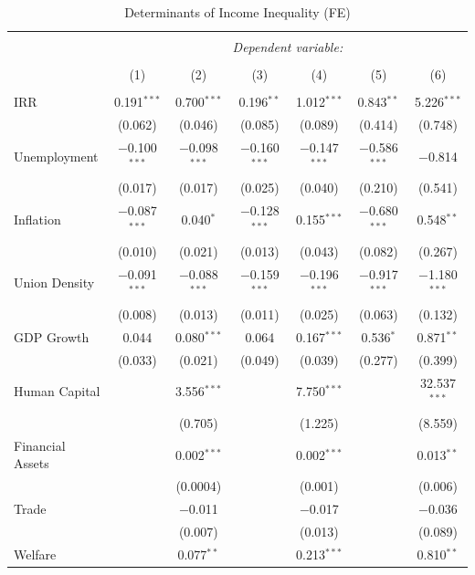 \documentclass[
  11pt,
]{article}
\begin{document}
\begin{table}[!htbp] \centering 
  \caption{\label{ineq1}Determinants of Income Inequality (FE)} 
  \label{} 
\small 
\begin{tabular}{@{\extracolsep{5pt}}lcccccc} 
\\[-1.8ex]\hline 
\hline \\[-1.8ex] 
 & \multicolumn{6}{c}{\textit{Dependent variable:}} \\ 
\cline{2-7} 
\\[-1.8ex] & (1) & (2) & (3) & (4) & (5) & (6)\\ 
\hline \\[-1.8ex] 
 IRR & 0.191$^{***}$ & 0.700$^{***}$ & 0.196$^{**}$ & 1.012$^{***}$ & 0.843$^{**}$ & 5.226$^{***}$ \\ 
  & (0.062) & (0.046) & (0.085) & (0.089) & (0.414) & (0.748) \\ 
  Unemployment & $-$0.100$^{***}$ & $-$0.098$^{***}$ & $-$0.160$^{***}$ & $-$0.147$^{***}$ & $-$0.586$^{***}$ & $-$0.814 \\ 
  & (0.017) & (0.017) & (0.025) & (0.040) & (0.210) & (0.541) \\ 
  Inflation & $-$0.087$^{***}$ & 0.040$^{*}$ & $-$0.128$^{***}$ & 0.155$^{***}$ & $-$0.680$^{***}$ & 0.548$^{**}$ \\ 
  & (0.010) & (0.021) & (0.013) & (0.043) & (0.082) & (0.267) \\ 
  Union Density & $-$0.091$^{***}$ & $-$0.088$^{***}$ & $-$0.159$^{***}$ & $-$0.196$^{***}$ & $-$0.917$^{***}$ & $-$1.180$^{***}$ \\ 
  & (0.008) & (0.013) & (0.011) & (0.025) & (0.063) & (0.132) \\ 
  GDP Growth & 0.044 & 0.080$^{***}$ & 0.064 & 0.167$^{***}$ & 0.536$^{*}$ & 0.871$^{**}$ \\ 
  & (0.033) & (0.021) & (0.049) & (0.039) & (0.277) & (0.399) \\ 
  Human Capital &  & 3.556$^{***}$ &  & 7.750$^{***}$ &  & 32.537$^{***}$ \\ 
  &  & (0.705) &  & (1.225) &  & (8.559) \\ 
  Financial Assets &  & 0.002$^{***}$ &  & 0.002$^{***}$ &  & 0.013$^{**}$ \\ 
  &  & (0.0004) &  & (0.001) &  & (0.006) \\ 
  Trade &  & $-$0.011 &  & $-$0.017 &  & $-$0.036 \\ 
  &  & (0.007) &  & (0.013) &  & (0.089) \\ 
  Welfare &  & 0.077$^{**}$ &  & 0.213$^{***}$ &  & 0.810$^{**}$ \\ 

\end{tabular}
\end{table}
\end{document}

